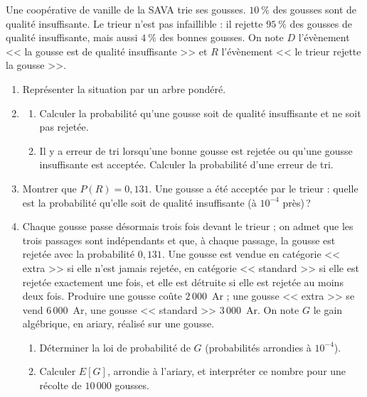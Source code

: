 \begin{exo}\label{exo:proba-23}
Une coop\'erative de vanille de la SAVA trie ses gousses.
$10~\%$ des gousses sont de qualit\'e insuffisante. Le trieur n'est pas infaillible :
il rejette $95~\%$ des gousses de qualit\'e insuffisante, mais aussi $4~\%$ des bonnes gousses.
On note $D$ l'\'ev\`enement << la gousse est de qualit\'e insuffisante >> et $R$ l'\'ev\`enement << le trieur rejette la gousse >>.
\begin{enumerate}
\item Repr\'esenter la situation par un arbre pond\'er\'e.
\item \begin{enumerate}
      \item Calculer la probabilit\'e qu'une gousse soit de qualit\'e insuffisante et ne soit pas rejet\'ee.
      \item Il y a erreur de tri lorsqu'une bonne gousse est rejet\'ee ou qu'une gousse insuffisante est accept\'ee.
            Calculer la probabilit\'e d'une erreur de tri.
      \end{enumerate}
\item Montrer que $P(R) = 0,131$. Une gousse a \'et\'e accept\'ee par le trieur :
      quelle est la probabilit\'e qu'elle soit de qualit\'e insuffisante (\`a $10^{-4}$ pr\`es)\,?
\item Chaque gousse passe d\'esormais trois fois devant le trieur ; on admet que les trois passages sont ind\'ependants
      et que, \`a chaque passage, la gousse est rejet\'ee avec la probabilit\'e $0,131$.
      Une gousse est vendue en cat\'egorie << extra >> si elle n'est jamais rejet\'ee,
      en cat\'egorie << standard >> si elle est rejet\'ee exactement une fois, et elle est d\'etruite si elle est rejet\'ee au moins deux fois.
      Produire une gousse co\^ute $2\,000$~Ar ; une gousse << extra >> se vend $6\,000$~Ar, une gousse << standard >> $3\,000$~Ar.
      On note $G$ le gain alg\'ebrique, en ariary, r\'ealis\'e sur une gousse.
      \begin{enumerate}
      \item D\'eterminer la loi de probabilit\'e de $G$ (probabilit\'es arrondies \`a $10^{-4}$).
      \item Calculer $E[G]$, arrondie \`a l'ariary, et interpr\'eter ce nombre pour une r\'ecolte de $10\,000$ gousses.
      \end{enumerate}
\end{enumerate}
\end{exo}


